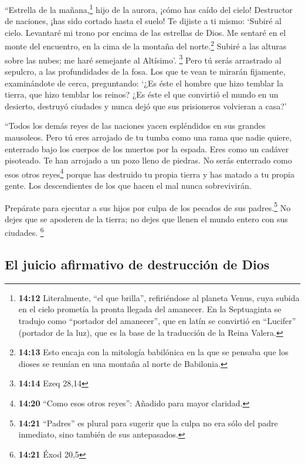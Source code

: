  ``Estrella de la mañana,\footnote{\textbf{14:12}
  Literalmente, ``el que brilla'', refiriéndose al planeta Venus, cuya
  subida en el cielo prometía la pronta llegada del amanecer. En la
  Septuaginta se tradujo como ``portador del amanecer'', que en latín se
  convirtió en ``Lucifer'' (portador de la luz), que es la base de la
  traducción de la Reina Valera.} hijo de la aurora, ¡cómo has caído del
cielo! Destructor de naciones, ¡has sido cortado hasta el suelo!
 Te dijiste a ti mismo: `Subiré al cielo. Levantaré mi
trono por encima de las estrellas de Dios. Me sentaré en el monte del
encuentro, en la cima de la montaña del norte.\footnote{\textbf{14:13}
  Esto encaja con la mitología babilónica en la que se pensaba que los
  dioses se reunían en una montaña al norte de Babilonia.}
 Subiré a las alturas sobre las nubes; me haré semejante
al Altísimo'. \footnote{\textbf{14:14} Ezeq 28,14}  Pero
tú serás arrastrado al sepulcro, a las profundidades de la fosa.
 Los que te vean te mirarán fijamente, examinándote de
cerca, preguntando: `¿Es éste el hombre que hizo temblar la tierra, que
hizo temblar los reinos?  ¿Es éste el que convirtió el
mundo en un desierto, destruyó ciudades y nunca dejó que sus prisioneros
volvieran a casa?'

 ``Todos los demás reyes de las naciones yacen
espléndidos en sus grandes mausoleos.  Pero tú eres
arrojado de tu tumba como una rama que nadie quiere, enterrado bajo los
cuerpos de los muertos por la espada. Eres como un cadáver pisoteado. Te
han arrojado a un pozo lleno de piedras.  No serás
enterrado como esos otros reyes\footnote{\textbf{14:20} ``Como esos
  otros reyes'': Añadido para mayor claridad.} porque has destruido tu
propia tierra y has matado a tu propia gente. Los descendientes de los
que hacen el mal nunca sobrevivirán.

 Prepárate para ejecutar a sus hijos por culpa de los
pecados de sus padres.\footnote{\textbf{14:21} ``Padres'' es plural para
  sugerir que la culpa no era sólo del padre inmediato, sino también de
  sus antepasados.} No dejes que se apoderen de la tierra; no dejes que
llenen el mundo entero con sus ciudades. \footnote{\textbf{14:21} Éxod
  20,5}

\hypertarget{el-juicio-afirmativo-de-destrucciuxf3n-de-dios}{%
\subsection{El juicio afirmativo de destrucción de
Dios}\label{el-juicio-afirmativo-de-destrucciuxf3n-de-dios}}

